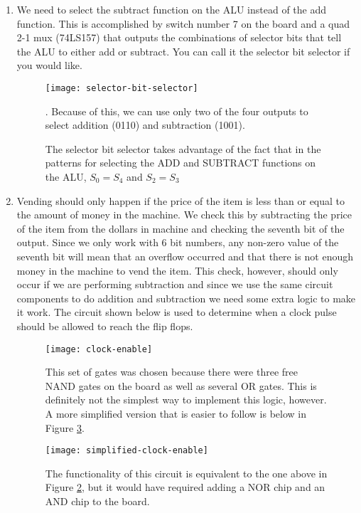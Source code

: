 \begin{enumerate}
\item We need to select the subtract function on the ALU instead of the add function. This is accomplished by switch number 7 on the board and a quad 2-1 mux (74LS157) that outputs the combinations of selector bits that tell the ALU to either add or subtract. You can call it the selector bit selector if you would like. 
\begin{figure}[H]
\centering
\texttt{[image: selector-bit-selector]} \\
\caption{The selector bit selector takes advantage of the fact that in the patterns for selecting the ADD and SUBTRACT functions on the ALU, $S_0 = S_4$ and $S_2 = S_3$}. Because of this, we can use only two of the four outputs to select addition (0110) and subtraction (1001). 
\label{selector-bit-selector}
\end{figure}

\item Vending should only happen if the price of the item is less than or equal to the amount of money in the machine. We check this by subtracting the price of the item from the dollars in machine and checking the seventh bit of the output. Since we only work with 6 bit numbers, any non-zero value of the seventh bit will mean that an overflow occurred and that there is not enough money in the machine to vend the item. This check, however, should only occur if we are performing subtraction and since we use the same circuit components to do addition and subtraction we need some extra logic to make it work. The circuit shown below is used to determine when a clock pulse should be allowed to reach the flip flops.
\begin{figure}[H]
\centering
\texttt{[image: clock-enable]} \\
\caption{This set of gates was chosen because there were three free NAND gates on the board as well as several OR gates. This is definitely not the simplest way to implement this logic, however. A more simplified version that is easier to follow is below in Figure \ref{clock-enable-simplified}.}
\label{clock-enable}
\end{figure}
\begin{figure}[H]
\centering
\texttt{[image: simplified-clock-enable]} \\
\caption{The functionality of this circuit is equivalent to the one above in Figure \ref{clock-enable}, but it would have required adding a NOR chip and an AND chip to the board.}
\label{clock-enable-simplified}
\end{figure}
\end{enumerate}
